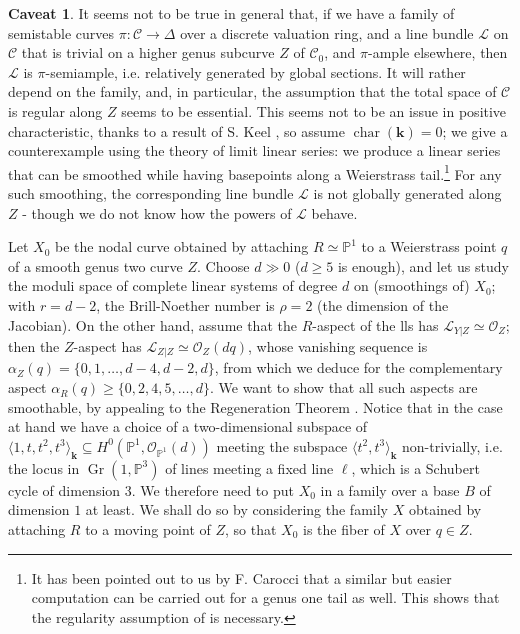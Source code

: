 \documentclass[11pt]{amsart}
\newcommand{\PP}{\mathbb P}
\renewcommand{\k}{\mathbf k}
\newcommand{\OO}{\mathcal O}
\renewcommand{\to}{\rightarrow}
\newcommand{\dvr}{\Delta}
\theoremstyle{plain}
\theoremstyle{definition}
\newtheorem{caveat}{Caveat}
\begin{document}
\begin{caveat}
 It seems not to be true in general that, if we have a family of semistable curves $\pi\colon\mathcal C\to\dvr$ over a discrete valuation ring, and a line bundle $\mathcal L$ on $\mathcal C$ that is trivial on a higher genus subcurve $Z$ of $\mathcal C_0$, and $\pi$-ample elsewhere, then $\mathcal L$ is $\pi$-semiample, i.e. relatively generated by global sections. It will rather depend on the family, and, in particular, the assumption that the total space of $\mathcal C$ is regular along $Z$ seems to be essential. This seems not to be an issue in positive characteristic, thanks to a result of S. Keel \cite{Keel-bpf}, so assume $\operatorname{char}(\k)=0$; we give a counterexample using the theory of limit linear series: we produce a linear series that can be smoothed while having basepoints along a Weierstrass tail.\footnote{It has been pointed out to us by F. Carocci that a similar but easier computation can be carried out for a genus one tail as well. This shows that the regularity assumption of \cite[Lemma 2.13]{SMY1} is necessary.} For any such smoothing, the corresponding line bundle $\mathcal L$ is not globally generated along $Z$ - though we do not know how the powers of $\mathcal L$ behave.
 
 Let $X_0$ be the nodal curve obtained by attaching $R\simeq\PP^1$ to a Weierstrass point $q$ of a smooth genus two curve $Z$. Choose $d\gg 0$ ($d\geq5$ is enough), and let us study the moduli space of complete linear systems of degree $d$ on (smoothings of) $X_0$; with $r=d-2$, the Brill-Noether number is $\rho=2$ (the dimension of the Jacobian). On the other hand, assume that the $R$-aspect of the lls has $\mathcal L_{Y|Z}\simeq\OO_Z$; then the $Z$-aspect has $\mathcal L_{Z|Z}\simeq\OO_Z(dq)$, whose vanishing sequence is $\alpha_Z(q)=\{0,1,\ldots,d-4,d-2,d\}$, from which we deduce for the complementary aspect $\alpha_R(q)\geq\{0,2,4,5,\ldots,d\}$. We want to show that all such aspects are smoothable, by appealing to the Regeneration Theorem \cite[Theorem 5.41]{HM}. Notice that in the case at hand we have a choice of a two-dimensional subspace of $\langle 1,t,t^2,t^3\rangle_\k\subseteq H^0(\PP^1,\OO_{\PP^1}(d))$ meeting the subspace $\langle t^2,t^3\rangle_\k$ non-trivially, i.e. the locus in $\operatorname{Gr}(1,\PP^3)$ of lines meeting a fixed line $\ell$, which is a Schubert cycle of dimension $3$. We therefore need to put $X_0$ in a family over a base $B$ of dimension $1$ at least.  We shall do so by considering the family $X$ obtained by attaching $R$ to a moving point of $Z$, so that $X_0$ is the fiber of $X$ over $q\in Z$.
 

\end{caveat}
\end{document}
